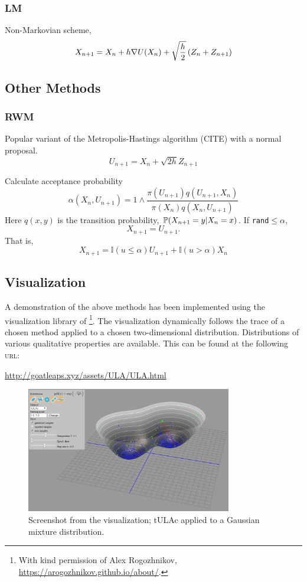 \subsubsection{LM}
\cite{LM12}
Non-Markovian scheme,
\[X_{n+1} = X_n +h \grad U(X_n) + \sqrt{\frac{h}{2}} \left(Z_n + Z_{n+1}\right) \]


\subsection{Other Methods}
\subsubsection{RWM}
Popular variant of the Metropolis-Hastings algorithm (CITE) with a normal proposal.
\[U_{n+1} = X_n + \sqrt{2h} Z_{n+1}\]

Calculate acceptance probability
\[\alpha(X_n,U_{n+1}) = 1\wedge \frac{\pi(U_{n+1})q(U_{n+1},X_n)}{\pi(X_n)q(X_n,U_{n+1})}\]
Here \(q(x,y)\) is the transition probability, \(\P(X_{n+1}=y | X_{n}=x)\). If \texttt{rand}\(\leq\alpha\),
\[X_{n+1} = U_{n+1}.\]
That is,
\[X_{n+1} = \mathbb{I}(u\leq \alpha)U_{n+1} +\mathbb{I}(u > \alpha)X_n \]

\subsection{Visualization}
A demonstration of the above methods has been implemented using the visualization library of \cite{rogozhnikov2016hmc}\footnote{With kind permission of Alex Rogozhnikov, \url{https://arogozhnikov.github.io/about/}.}. The visualization dynamically follows the trace of a chosen method applied to a chosen two-dimensional distribution. Distributions of various qualitative properties are available. This can be found at the following \textsc{url}: \\
   \centerline{ \url{http://goatleaps.xyz/assets/ULA/ULA.html}}

\begin{figure}[H]
\centering
  \begin{minipage}[b]{0.8\textwidth}
  \centering
    \includegraphics[width=0.8\textwidth]{Figures/ulavis.PNG}
    \caption{Screenshot from the visualization;  tULAc applied to a Gaussian mixture distribution.}
  \end{minipage}
\end{figure}